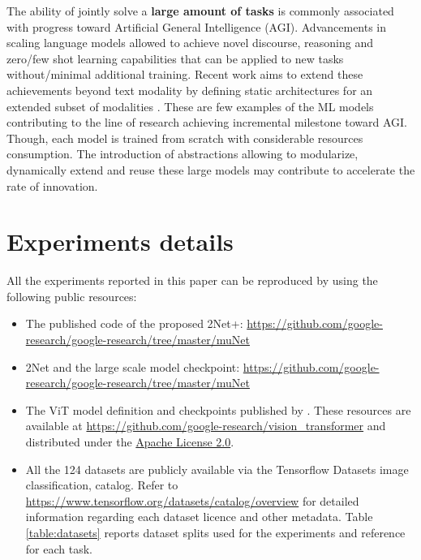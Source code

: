 \documentclass{article} \usepackage{iclr2023_conference,times}
\newcommand{\method}{2Net+\xspace}
\begin{document}
The ability of jointly solve a \textbf{large amount of tasks} is commonly associated with progress toward Artificial General Intelligence (AGI).
Advancements in scaling language models \citep{Brown2020LanguageMA,Thoppilan2022LaMDALM} allowed to achieve novel discourse, reasoning and zero/few shot learning capabilities that can be applied to new tasks without/minimal additional training.
Recent work aims to extend these achievements beyond text modality by defining static architectures for an extended subset of modalities \citep{Alayrac2022FlamingoAV,Reed2022AGA}.
These are few examples of the ML models contributing to the line of research achieving incremental milestone toward AGI.
Though, each model is trained from scratch with considerable resources consumption.
The introduction of abstractions allowing to modularize, dynamically extend and reuse these large models may contribute to accelerate the rate of innovation. 













\section{Experiments details}
\label{section:repro}
All the experiments reported in this paper can be reproduced by using the following public resources:
\begin{itemize}

\item The published code of the proposed \method:
\href{https://github.com/google-research/google-research/tree/master/muNet}{https://github.com/google-research/google-research/tree/master/muNet}


\item 2Net and the large scale model checkpoint: \href{https://github.com/google-research/google-research/tree/master/muNet}{https://github.com/google-research/google-research/tree/master/muNet}


    \item 
The ViT model definition and checkpoints published by \citet{Steiner2021HowTT}.
These resources are available at  \href{https://github.com/google-research/vision_transformer}{https://github.com/google-research/vision\_transformer} and distributed under the \href{https://github.com/google-research/vision_transformer/blob/main/LICENSE}{Apache License 2.0}.

\item All the 124 datasets are publicly available via the Tensorflow Datasets image classification,  catalog.
Refer to \href{https://www.tensorflow.org/datasets/catalog/overview}{https://www.tensorflow.org/datasets/catalog/overview} for detailed information regarding each dataset licence and other metadata.
Table \ref{table:datasets} reports dataset splits used for the experiments and reference for each task.
\end{itemize}
\end{document}
